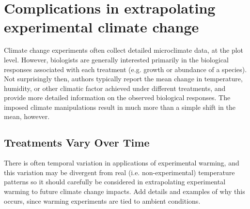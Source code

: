 \documentclass{article}
\begin{document}
\section {Complications in extrapolating experimental climate change}
Climate change experiments often collect detailed microclimate data, at the plot level. However, biologists are generally interested primarily in the biological responses associated with each treatment (e.g. growth or abundance of a species). Not surprisingly then, authors typically report the mean change in temperature, humidity, or other climatic factor achieved under different treatments, and provide more detailed information on the observed biological responses. The imposed climate manipulations result in much more than a simple shift in the mean, however.
\subsection {Treatments Vary Over Time}
There is often temporal variation in applications of experimental warming, and this variation may be divergent from real (i.e. non-experimental) temperature patterns so it should carefully be considered in extrapolating experimental warming to future climate change impacts. Add details and examples of why this occurs, since warming experiments are tied to ambient conditions. 
\end{document}
